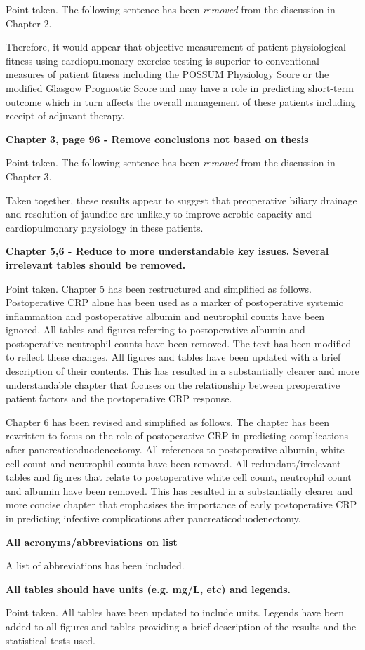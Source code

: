	Point taken. The following sentence has been \textit{removed} from the discussion in Chapter 2.
	
	Therefore, it would appear that objective measurement of patient physiological fitness using cardiopulmonary exercise testing is superior to conventional measures of patient fitness including the POSSUM Physiology Score or the modified Glasgow Prognostic Score and may have a role in predicting short-term outcome which in turn affects the overall management of these patients including receipt of adjuvant therapy.
	
\textbf{Chapter 3, page 96 - Remove conclusions not based on thesis}
	
	Point taken. The following sentence has been \textit{removed} from the discussion in Chapter 3.
	
	Taken together, these results appear to suggest that preoperative biliary drainage and resolution of jaundice are unlikely to improve aerobic capacity and cardiopulmonary physiology in these patients.
	
\textbf{Chapter 5,6 - Reduce to more understandable key issues. Several irrelevant tables should be removed.}

	Point taken. 
	Chapter 5 has been restructured and simplified as follows. 
	Postoperative CRP alone has been used as a marker of postoperative systemic inflammation and postoperative albumin and neutrophil counts have been ignored.
	All tables and figures referring to postoperative albumin and postoperative neutrophil counts have been removed. 
	The text has been modified to reflect these changes. 
	All figures and tables have been updated with a brief description of their contents. 
	This has resulted in a substantially clearer and more understandable chapter that focuses on the relationship between preoperative patient factors and the postoperative CRP response.
	
	Chapter 6 has been revised and simplified as follows.
	The chapter has been rewritten to focus on the role of postoperative CRP in predicting complications after pancreaticoduodenectomy.
	All references to postoperative albumin, white cell count and neutrophil counts have been removed.
	All redundant/irrelevant tables and figures that relate to postoperative white cell count, neutrophil count and albumin have been removed.
	This has resulted in a substantially clearer and more concise chapter that emphasises the importance of early postoperative CRP in predicting infective complications after pancreaticoduodenectomy.
	
\textbf{All acronyms/abbreviations on list}
	
	A list of abbreviations has been included.
	
\textbf{All tables should have units (e.g. mg/L, etc) and legends.}
	
	Point taken. 
	All tables have been updated to include units. 
	Legends have been added to all figures and tables providing a brief description of the results and the statistical tests used.
